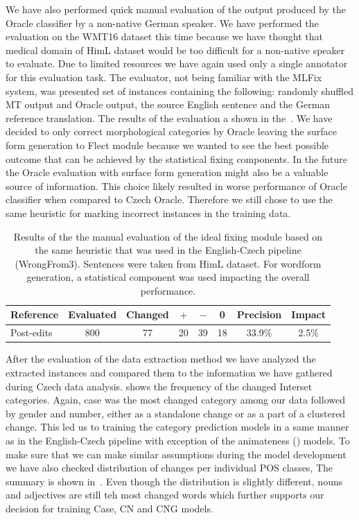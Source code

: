 We have also performed quick manual evaluation of the output produced by the Oracle classifier by a non-native
German speaker.
We have performed the evaluation on the WMT16 dataset this time because we have thought that medical domain of HimL dataset
would be too difficult for a non-native speaker to evaluate.
Due to limited
resources we have again used only a single annotator for this evaluation task. The evaluator, not being familiar
with the MLFix system, was presented set of instances containing the following: randomly shuffled MT output and Oracle output,
the source English sentence and the German reference translation. The results of the evaluation a shown in the~.
We have decided to only correct morphological categories by Oracle leaving the surface form generation to Flect module because
we wanted to see the best possible outcome that can be achieved by the statistical fixing components. In the future
the Oracle evaluation with  surface form generation might also be a valuable source of information.
This choice likely resulted in worse performance of Oracle classifier when compared to Czech Oracle. Therefore
we still chose to use the same heuristic for marking incorrect instances in the training data.

\begin{table}[t]
\centering
\small

\begin{tabular}{l|cc|ccc|cc}
Reference  &  Evaluated  &  Changed  &  $+$  &  $-$  &  0  &  Precision  &  Impact  \\
\hline
Post-edits  &  800  &  77  &  20  &  39  &  18  &  33.9\%  &  2.5\%  \\
\end{tabular}
\caption[Manual evaluation of the German Oracle classifier]{
Results of the the manual evaluation of the ideal fixing module based on the same heuristic
that was used in the English-Czech pipeline (WrongFrom3). Sentences were taken from HimL dataset. For wordform generation, a statistical component
was used impacting the overall performance.
}
\label{oracle_de-maneval}
\end{table}

After the evaluation of the data extraction method we have analyzed the extracted instances and compared them
to the information we have gathered during Czech data analysis.  shows the frequency of the changed Interset
categories. Again, case was the most changed category among our data followed by gender and number, either as a standalone change or
as a part of a clustered change. This led us to training the category prediction models in a same manner as in the English-Czech
pipeline with exception of the animateness () models. To make sure that we can make similar assumptions during
the model development we have also checked distribution of changes per individual POS classes, The summary is shown in~.
Even though the distribution is slightly different, nouns and adjectives are still teh most changed words which further supports
our decision for training Case, CN and CNG models.

